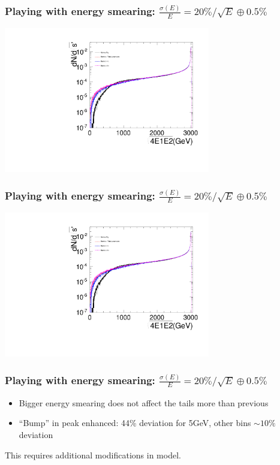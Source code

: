 \documentclass{beamer}
\begin{document}
\begin{frame}
\frametitle{Playing with energy smearing:
$\frac{\sigma(E)}{E}=20\%/\sqrt{E}\oplus0.5\%$}
\centering
\includegraphics[width=9cm,page=4]{Spectra_BHWide_Esmeared20005.pdf}
\end{frame}
\begin{frame}
\frametitle{Playing with energy smearing:
$\frac{\sigma(E)}{E}=20\%/\sqrt{E}\oplus0.5\%$}
\centering
\includegraphics[width=9cm,page=3]{Spectra_BHWide_Esmeared20005.pdf}
\end{frame}
\begin{frame}
\frametitle{Playing with energy smearing:
$\frac{\sigma(E)}{E}=20\%/\sqrt{E}\oplus0.5\%$}
\begin{itemize}
  \item Bigger energy smearing does not affect the tails more than previous
  \item ``Bump'' in peak enhanced: 44\% deviation for 5GeV, other bins 
  $\sim10\%$ deviation
\end{itemize}
This requires additional modifications in model. 
\end{frame}
\end{document}
